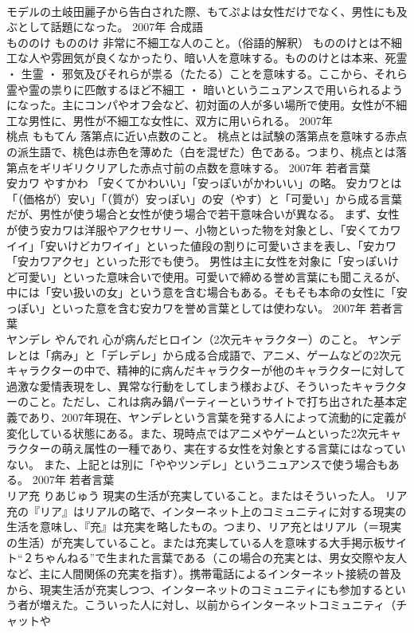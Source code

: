 \documentclass[8pt]{extreport}
\begin{document}
\begin{CJK}{UTF8}{min}
\\	モデルの土岐田麗子から告白された際、もてぷよは女性だけでなく、男性にも及ぶとして話題になった。	2007年	合成語	
\\	もののけ	もののけ	非常に不細工な人のこと。（俗語的解釈）	もののけとは不細工な人や雰囲気が良くなかったり、暗い人を意味する。もののけとは本来、死霊 ・ 生霊 ・ 邪気及びそれらが祟る（たたる）ことを意味する。ここから、それら霊や霊の祟りに匹敵するほど不細工 ・ 暗いというニュアンスで用いられるようになった。主にコンパやオフ会など、初対面の人が多い場所で使用。女性が不細工な男性に、男性が不細工な女性に、双方に用いられる。	2007年	
\\	桃点	ももてん	落第点に近い点数のこと。	桃点とは試験の落第点を意味する赤点の派生語で、桃色は赤色を薄めた（白を混ぜた）色である。つまり、桃点とは落第点をギリギリクリアした赤点寸前の点数を意味する。	2007年	若者言葉	
\\	安カワ	やすかわ	「安くてかわいい」「安っぽいがかわいい」の略。	安カワとは「（価格が）安い」「（質が）安っぽい」の安（やす）と「可愛い」から成る言葉だが、男性が使う場合と女性が使う場合で若干意味合いが異なる。 まず、女性が使う安カワは洋服やアクセサリー、小物といった物を対象とし、「安くてカワイイ」「安いけどカワイイ」といった値段の割りに可愛いさまを表し、「安カワ
\\	「安カワアクセ」といった形でも使う。 男性は主に女性を対象に「安っぽいけど可愛い」といった意味合いで使用。可愛いで締める誉め言葉にも聞こえるが、中には「安い扱いの女」という意を含む場合もある。そもそも本命の女性に「安っぽい」といった意を含む安カワを誉め言葉としては使わない。	2007年	若者言葉	
\\	ヤンデレ	やんでれ	心が病んだヒロイン（2次元キャラクター）のこと。	ヤンデレとは「病み」と「デレデレ」から成る合成語で、アニメ、ゲームなどの2次元キャラクターの中で、精神的に病んだキャラクターが他のキャラクターに対して過激な愛情表現をし、異常な行動をしてしまう様および、そういったキャラクターのこと。ただし、これは病み鍋パーティーというサイトで打ち出された基本定義であり、2007年現在、ヤンデレという言葉を発する人によって流動的に定義が変化している状態にある。また、現時点ではアニメやゲームといった2次元キャラクターの萌え属性の一種であり、実在する女性を対象とする言葉にはなっていない。 また、上記とは別に「ややツンデレ」というニュアンスで使う場合もある。	2007年	若者言葉	
\\	リア充	りあじゅう	現実の生活が充実していること。またはそういった人。	リア充の『リア』はリアルの略で、インターネット上のコミュニティに対する現実の生活を意味し、『充』は充実を略したもの。つまり、リア充とはリアル（＝現実の生活）が充実していること。または充実している人を意味する大手掲示板サイト“２ちゃんねる”で生まれた言葉である（この場合の充実とは、男女交際や友人など、主に人間関係の充実を指す）。携帯電話によるインターネット接続の普及から、現実生活が充実しつつ、インターネットのコミュニティにも参加するという者が増えた。こういった人に対し、以前からインターネットコミュニティ（チャットや

\end{CJK}
\end{document}
